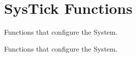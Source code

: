 \hypertarget{group___c_m_s_i_s___core___sys_tick_functions}{}\section{Sys\+Tick Functions}
\label{group___c_m_s_i_s___core___sys_tick_functions}


Functions that configure the System.  


Functions that configure the System. 

